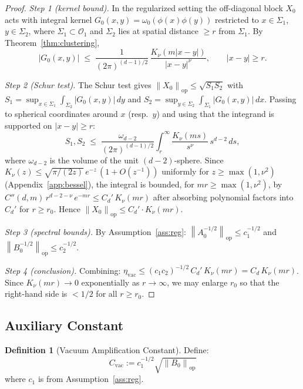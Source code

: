 \documentclass[11pt,a4paper]{article}
\theoremstyle{plain}
\theoremstyle{definition}
\newtheorem{definition}[theorem]{Definition}
\theoremstyle{remark}
\newcommand{\Oo}{\mathcal{O}}
\newcommand{\opnorm}[1]{\left\lVert #1 \right\rVert_{\mathrm{op}}}
\newcommand{\etavac}{\eta_{\mathrm{vac}}}
\newcommand{\Cvac}{C_{\mathrm{vac}}}
\begin{document}
\begin{proof}
\emph{Step 1 (kernel bound).} In the regularized setting the off-diagonal block
$X_0$ acts with integral kernel $G_0(x,y) = \omega_0(\phi(x)\phi(y))$ restricted to
$x \in \Sigma_1$, $y \in \Sigma_2$, where $\Sigma_1 \subset \Oo_1$ and $\Sigma_2$
lies at spatial distance $\ge r$ from $\Sigma_1$. By
Theorem~\ref{thm:clustering},
\begin{equation}
|G_0(x,y)| \;\le\; \frac{1}{(2\pi)^{(d-1)/2}}\,
\frac{K_\nu(m|x-y|)}{|x-y|^{\nu}}, \qquad |x-y| \ge r.
\end{equation}

\emph{Step 2 (Schur test).} The Schur test gives
$\opnorm{X_0} \le \sqrt{S_1 S_2}$ with
$S_1 = \sup_{x \in \Sigma_1} \int_{\Sigma_2} |G_0(x,y)|\,dy$ and
$S_2 = \sup_{y \in \Sigma_2} \int_{\Sigma_1} |G_0(x,y)|\,dx$. Passing to spherical
coordinates around $x$ (resp.\ $y$) and using that the integrand is supported on
$|x - y| \ge r$:
\begin{equation}
S_1, S_2 \;\le\; \frac{\omega_{d-2}}{(2\pi)^{(d-1)/2}}
\int_r^{\infty} \frac{K_\nu(ms)}{s^{\nu}}\, s^{d-2}\, ds,
\end{equation}
where $\omega_{d-2}$ is the volume of the unit $(d-2)$-sphere. Since
$K_\nu(z) \le \sqrt{\pi/(2z)}\,e^{-z}\,(1 + O(z^{-1}))$ uniformly for
$z \ge \max(1, \nu^2)$ (Appendix~\ref{app:bessel}), the integral is bounded, for
$mr \ge \max(1,\nu^2)$, by $C''(d,m)\, r^{d-2-\nu}\, e^{-mr}
\le C_d'\, K_\nu(mr)$ after absorbing polynomial factors into $C_d'$ for
$r \ge r_0$. Hence $\opnorm{X_0} \le C_d' \cdot K_\nu(mr)$.

\emph{Step 3 (spectral bounds).} By Assumption~\ref{ass:reg}:
$\opnorm{A_0^{-1/2}} \le c_1^{-1/2}$ and $\opnorm{B_0^{-1/2}} \le c_2^{-1/2}$.

\emph{Step 4 (conclusion).} Combining:
$\etavac \le (c_1 c_2)^{-1/2}\, C_d'\, K_\nu(mr) = C_d\, K_\nu(mr)$. Since
$K_\nu(mr) \to 0$ exponentially as $r \to \infty$, we may enlarge $r_0$ so that the
right-hand side is $< 1/2$ for all $r \ge r_0$.
\end{proof}

\subsection{Auxiliary Constant}

\begin{definition}[Vacuum Amplification Constant]
Define:
\begin{equation}
\Cvac := c_1^{-1/2} \sqrt{\opnorm{B_0}}
\end{equation}
where $c_1$ is from Assumption~\ref{ass:reg}.
\end{definition}
\end{document}
